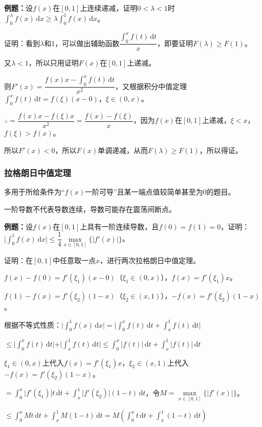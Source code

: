 \documentclass[UTF8, 12pt]{ctexart}
\begin{document}
\textbf{例题：}设$f(x)$在$[0,1]$上连续递减，证明$0<\lambda<1$时$\int_0^\lambda f(x)\,\textrm{d}x\geqslant\lambda\int_0^1f(x)\,\textrm{d}x$。

证明：看到$\lambda$和1，可以做出辅助函数$\dfrac{\int_0^xf(t)\,\textrm{d}t}{x}$，即要证明$F(\lambda)\geqslant F(1)$。

又$\lambda<1$，所以只用证明$F(x)$在$[0,1]$上递减。

则$F'(x)=\dfrac{f(x)x-\int_0^xf(t)\,\textrm{d}t}{x^2}$，又根据积分中值定理$\int_0^xf(t)\,\textrm{d}t=f(\xi)(x-0)$，$\xi\in(0,x)$。

$\therefore=\dfrac{f(x)x-f(\xi)x}{x^2}=\dfrac{f(x)-f(\xi)}{x}$，因为$f(x)$在$[0,1]$上递减，$\xi<x$，$f(\xi)>f(x)$。

所以$F'(x)<0$，所以$F(x)$单调递减，从而$F(\lambda)\geqslant F(1)$，所以得证。

\subsubsection{拉格朗日中值定理}

多用于所给条件为“$f(x)$一阶可导”且某一端点值较简单甚至为0的题目。

一阶导数不代表导数连续，导数可能存在震荡间断点。

\textbf{例题：}设$f(x)$在$[0,1]$上具有一阶连续导数，且$f(0)=f(1)=0$，证明：$\vert\int_0^1f(x)\,\textrm{d}x\vert\leqslant\dfrac{1}{4}\max\limits_{x\in[0,1]}\{\vert f'(x)\vert\}$。

证明：在$[0,1]$中任意取一点$x$，进行两次拉格朗日中值定理。

$f(x)-f(0)=f'(\xi_1)(x-0)$（$\xi_1\in(0,x)$），$f(x)=f'(\xi_1)x$。

$f(1)-f(x)=f'(\xi_2)(1-x)$（$\xi_2\in(x,1)$），$-f(x)=f'(\xi_2)(1-x)$。

根据不等式性质：$\vert\int_0^1f(x)\,\textrm{d}x\vert=\vert\int_0^xf(t)\,\textrm{d}t+\int_x^1f(t)\,\textrm{d}t\vert$

$\leqslant\vert\int_0^xf(t)\,\textrm{d}t\vert+\vert\int_x^1f(t)\,\textrm{d}t\vert\leqslant\int_0^x\vert f(t)\vert\,\textrm{d}t+\int_x^1\vert f(t)\vert\,\textrm{d}t$

$\xi_1\in(0,x)$上代入$f(x)=f'(\xi_1)x$，$\xi_2\in(x,1)$上代入$-f(x)=f'(\xi_2)(1-x)$。

$=\int_0^x\vert f'(\xi_1)\vert t\,\textrm{d}t+\int_x^1\vert f'(\xi_2)\vert(1-t)\,\textrm{d}t$，令$M=\max\limits_{x\in[0,1]}\{\vert f'(x)\vert\}$。

$\leqslant\int_0^xMt\,\textrm{d}t+\int_x^1M(1-t)\,\textrm{d}t=M\left(\int_0^xt\,\textrm{d}t+\int_x^1(1-t)\,\textrm{d}t\right)$
\end{document}
